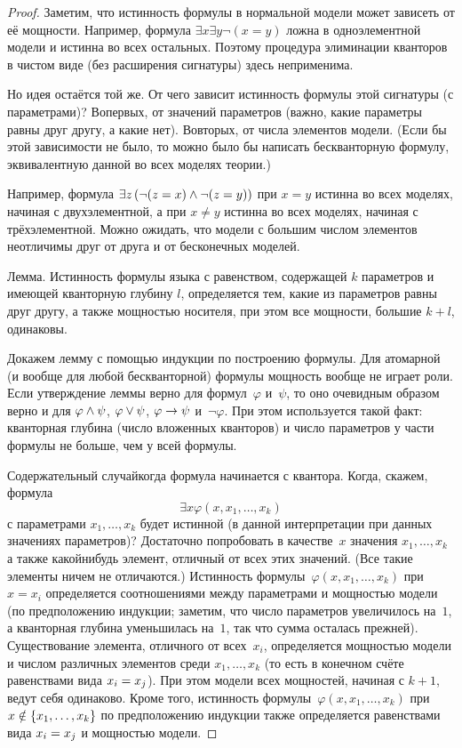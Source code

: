 \begin{proof}
Заметим, что истинность формулы в нормальной модели может
зависеть от её мощности. Например, формула $\exists x\exists y
\lnot (x=y)$ ложна в одноэлементной модели и истинна во всех
остальных. Поэтому процедура элиминации кванторов в чистом виде
(без расширения сигнатуры) здесь неприменима.

Но идея остаётся той же. От чего зависит истинность формулы
этой сигнатуры (с параметрами)? Во\д первых, от значений параметров
(важно, какие параметры равны друг другу, а какие нет).
Во\д вторых, от числа элементов модели. (Если бы этой зависимости
не было, то можно было бы написать бескванторную формулу,
эквивалентную данной во всех моделях теории.)

Например, формула $\exists z\,
({\lnot(z=x)}\hm\land{\lnot(z=y)})$ при $x=y$ истинна во всех
моделях, начиная с двухэлементной, а при $x\ne y$ истинна во
всех моделях, начиная с трёхэлементной. Можно ожидать, что
модели с большим числом элементов неотличимы друг от друга и от
бесконечных моделей.

\textsf{Лемма}. Истинность формулы языка с равенством, содержащей
$k$ параметров и имеющей кванторную глубину $l$, определяется
тем, какие из параметров равны друг другу, а также мощностью
носителя, при этом все мощности, большие $k+l$, одинаковы.

Докажем лемму с помощью индукции по построению формулы.
Для атомарной (и вообще для любой бескванторной) формулы
мощность вообще не играет роли. Если утверждение леммы верно для
формул~$\varphi$ и~$\psi$, то оно очевидным образом верно и для
$\varphi\hm\land\psi$, $\varphi\hm\lor\psi$, $\varphi\hm\to\psi$
и~$\lnot\varphi$. При этом используется такой факт:
кванторная глубина (число вложенных кванторов) и число
параметров у части формулы не больше, чем у всей формулы.

Содержательный случай\т когда формула начинается с
квантора. Когда, скажем, формула
        $$
\exists x \varphi(x,x_1,\dots,x_k)
        $$
с параметрами $x_1,\dots,x_k$ будет истинной (в данной
интерпретации при данных значениях параметров)? Достаточно
попробовать в качестве~$x$ значения $x_1,\dots,x_k$ а также
какой\д нибудь элемент, отличный от всех этих значений. (Все
такие элементы ничем не отличаются.) Истинность
формулы~$\varphi(x,x_1,\dots,x_k)$ при~$x=x_i$ определяется
соотношениями между
параметрами и мощностью модели (по предположению
индукции; заметим, что число параметров увеличилось на~$1$, а
кванторная глубина уменьшилась на~$1$, так что сумма осталась
прежней). Существование элемента, отличного от всех~$x_i$,
определяется мощностью модели и числом различных элементов среди
$x_1,\dots,x_k$ (то есть в конечном счёте равенствами вида
$x_i\hm=x_j$). При этом модели всех мощностей, начиная с $k+1$,
ведут себя одинаково. Кроме того, истинность
формулы~$\varphi(x,x_1,\dots,x_k)$ при
$x\hm\notin\{x_1,\dots,x_k\}$ по предположению индукции также
определяется равенствами вида $x_i\hm=x_j$ и мощностью модели.


\end{proof}
